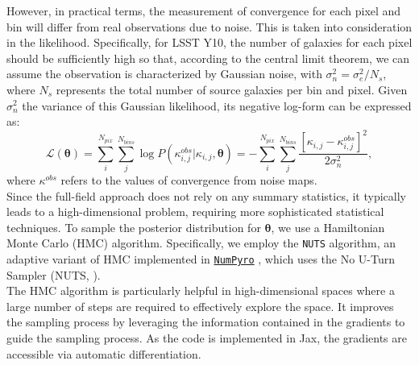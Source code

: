 \documentclass{aa}
\begin{document}
However, in practical terms, the measurement of convergence for each pixel and bin will differ from real observations due to noise. This is taken into consideration in the likelihood. Specifically, for LSST Y10, the number of galaxies for each pixel should be sufficiently high so that, according to the central limit theorem, we can assume the observation is characterized by Gaussian noise, with $\sigma_n^2=\sigma_e^2/N_s$, where $N_s$ represents the total number of source galaxies per bin and pixel. Given $\sigma_n^2$ the variance of this Gaussian likelihood, its negative log-form can be expressed as:
\begin{equation}
    \mathcal{L}(\bm{\theta})=
    \sum_i^{N_{pix}} \sum_{j}^{N_{bins}} \log{P(\kappa^{obs}_{i,j}|\kappa_{i,j},\bm{\theta})}
    =-\sum_i^{N_{pix}} \sum_{j}^{N_{bins}}\frac{[\kappa_{i,j}-\kappa^{obs}_{i,j}]^2}{2\sigma_n^2},
\end{equation}
where $\kappa^{obs}$ refers to the values of convergence from noise maps. \\
Since the full-field approach does not rely on any summary statistics, it typically leads to a high-dimensional problem, requiring more sophisticated statistical techniques. To sample the posterior distribution for $\bm{\theta}$, we use a Hamiltonian Monte Carlo (HMC) algorithm. 
Specifically, we employ the \texttt{NUTS} algorithm, an adaptive variant of HMC implemented in \href{https://github.com/pyro-ppl/numpyro}{\texttt{NumPyro}} \citep{phan2019composable, bingham2019pyro}, which uses the No U-Turn Sampler (NUTS, \citet{hoffman2014no}). \\
The HMC algorithm is particularly helpful in high-dimensional spaces where a large number of steps are required to effectively explore the space. It improves the sampling process by leveraging the information contained in the gradients to guide the sampling process. As the code is implemented in Jax, the gradients are accessible via automatic differentiation. 
\end{document}
